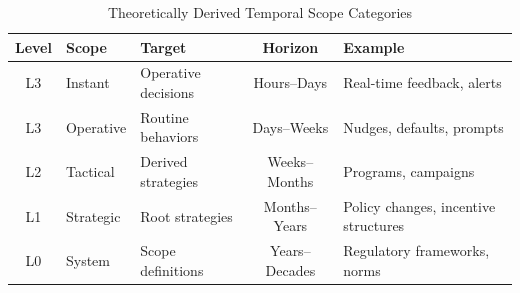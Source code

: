 \begin{table}[htbp]
\centering
\caption{Theoretically Derived Temporal Scope Categories}
\label{tab:hhh-temporal-derived}
\renewcommand{\arraystretch}{1.3}
\begin{tabular}{@{}cllcp{4cm}@{}}
\toprule
\textbf{Level} & \textbf{Scope} & \textbf{Target} & \textbf{Horizon} & \textbf{Example} \\
\midrule
L3 & Instant & Operative decisions & Hours--Days & Real-time feedback, alerts \\
L3 & Operative & Routine behaviors & Days--Weeks & Nudges, defaults, prompts \\
L2 & Tactical & Derived strategies & Weeks--Months & Programs, campaigns \\
L1 & Strategic & Root strategies & Months--Years & Policy changes, incentive structures \\
L0 & System & Scope definitions & Years--Decades & Regulatory frameworks, norms \\
\bottomrule
\end{tabular}
\end{table}

